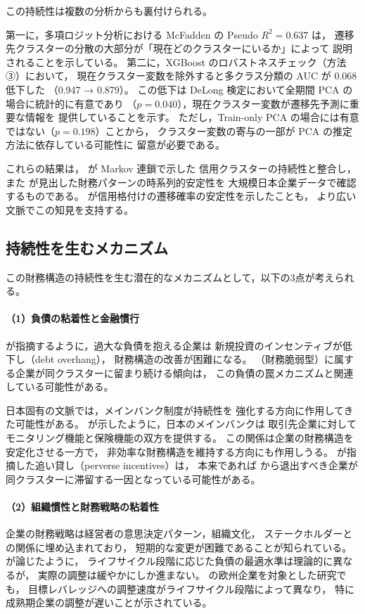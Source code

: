 この持続性は複数の分析からも裏付けられる。

第一に，多項ロジット分析における McFadden の Pseudo $R^2 = 0.637$ は，
遷移先クラスターの分散の大部分が「現在どのクラスターにいるか」によって
説明されることを示している。
第二に，XGBoost のロバストネスチェック（方法③）において，
現在クラスター変数を除外すると多クラス分類の AUC が 0.068 低下した
（0.947 → 0.879）。
この低下は DeLong 検定において全期間 PCA の場合に統計的に有意であり
（$p = 0.040$），現在クラスター変数が遷移先予測に重要な情報を
提供していることを示す。
ただし，Train-only PCA の場合には有意ではない（$p = 0.198$）ことから，
クラスター変数の寄与の一部が PCA の推定方法に依存している可能性に
留意が必要である。

これらの結果は， が Markov 連鎖で示した
信用クラスターの持続性と整合し，
また  が見出した財務パターンの時系列的安定性を
大規模日本企業データで確認するものである。
 が信用格付けの遷移確率の安定性を示したことも，
より広い文脈でこの知見を支持する。

\subsection{持続性を生むメカニズム}

この財務構造の持続性を生む潜在的なメカニズムとして，以下の3点が考えられる。

\paragraph{（1）負債の粘着性と金融慣行}
 が指摘するように，過大な負債を抱える企業は
新規投資のインセンティブが低下し（debt overhang），
財務構造の改善が困難になる。
（財務脆弱型）に属する企業が同クラスターに留まり続ける傾向は，
この負債の罠メカニズムと関連している可能性がある。

日本固有の文脈では，メインバンク制度が持続性を
強化する方向に作用してきた可能性がある。
 が示したように，日本のメインバンクは
取引先企業に対してモニタリング機能と保険機能の双方を提供する。
この関係は企業の財務構造を安定化させる一方で，
非効率な財務構造を維持する方向にも作用しうる。
 が指摘した追い貸し（perverse incentives）は，
本来であれば  から退出すべき企業が
同クラスターに滞留する一因となっている可能性がある。

\paragraph{（2）組織慣性と財務戦略の粘着性}
企業の財務戦略は経営者の意思決定パターン，組織文化，
ステークホルダーとの関係に埋め込まれており，
短期的な変更が困難であることが知られている。
 が論じたように，
ライフサイクル段階に応じた負債の最適水準は理論的に異なるが，
実際の調整は緩やかにしか進まない。
 の欧州企業を対象とした研究でも，
目標レバレッジへの調整速度がライフサイクル段階によって異なり，
特に成熟期企業の調整が遅いことが示されている。

